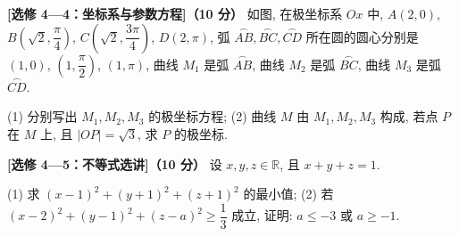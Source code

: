 \Needspace{0.4\textheight}
\begin{question}
\textbf{[选修 4—4：坐标系与参数方程]（10 分）} 
如图, 在极坐标系 $Ox$ 中, $A(2, 0)$, $B\left(\sqrt{2}, \dfrac{\pi}{4}\right)$, $C\left(\sqrt{2}, \dfrac{3\pi}{4}\right)$, $D(2, \pi)$, 弧 $\overset{\frown}{AB}, \overset{\frown}{BC}, \overset{\frown}{CD}$ 所在圆的圆心分别是 $(1, 0)$, $\left(1, \dfrac{\pi}{2}\right)$, $(1, \pi)$, 曲线 $M_1$ 是弧 $\overset{\frown}{AB}$, 曲线 $M_2$ 是弧 $\overset{\frown}{BC}$, 曲线 $M_3$ 是弧 $\overset{\frown}{CD}$.
\nopagebreak[4]
\begin{center}\end{center}
\nopagebreak[4]
(1) 分别写出 $M_1, M_2, M_3$ 的极坐标方程;  
(2) 曲线 $M$ 由 $M_1, M_2, M_3$ 构成, 若点 $P$ 在 $M$ 上, 且 $|OP| = \sqrt{3}$, 求 $P$ 的极坐标.

\end{question}
\begin{question}
\textbf{[选修 4—5：不等式选讲]（10 分）} 
设 $x, y, z \in \mathbb{R}$, 且 $x + y + z = 1$.

(1) 求 $(x - 1)^2 + (y + 1)^2 + (z + 1)^2$ 的最小值;  
(2) 若 $(x - 2)^2 + (y - 1)^2 + (z - a)^2 \geqslant \dfrac{1}{3}$ 成立, 证明: $a \leqslant -3$ 或 $a \geqslant -1$.

\end{question}